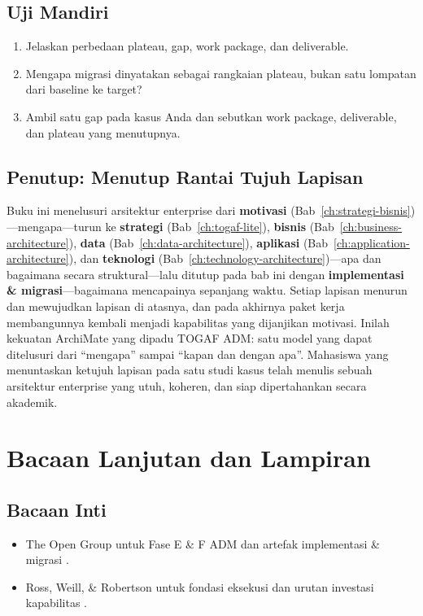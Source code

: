 \subsection*{Uji Mandiri}
\begin{enumerate}
  \item Jelaskan perbedaan plateau, gap, work package, dan deliverable.
  \item Mengapa migrasi dinyatakan sebagai rangkaian plateau, bukan satu lompatan
        dari baseline ke target?
  \item Ambil satu gap pada kasus Anda dan sebutkan work package, deliverable, dan
        plateau yang menutupnya.
\end{enumerate}

\subsection*{Penutup: Menutup Rantai Tujuh Lapisan}
Buku ini menelusuri arsitektur enterprise dari \textbf{motivasi}
(Bab~\ref{ch:strategi-bisnis})---mengapa---turun ke \textbf{strategi}
(Bab~\ref{ch:togaf-lite}), \textbf{bisnis}
(Bab~\ref{ch:business-architecture}), \textbf{data}
(Bab~\ref{ch:data-architecture}), \textbf{aplikasi}
(Bab~\ref{ch:application-architecture}), dan \textbf{teknologi}
(Bab~\ref{ch:technology-architecture})---apa dan bagaimana secara struktural---lalu
ditutup pada bab ini dengan \textbf{implementasi \& migrasi}---bagaimana
mencapainya sepanjang waktu. Setiap lapisan menurun dan mewujudkan lapisan di
atasnya, dan pada akhirnya paket kerja membangunnya kembali menjadi kapabilitas
yang dijanjikan motivasi. Inilah kekuatan ArchiMate yang dipadu TOGAF ADM: satu
model yang dapat ditelusuri dari ``mengapa'' sampai ``kapan dan dengan apa''.
Mahasiswa yang menuntaskan ketujuh lapisan pada satu studi kasus telah menulis
sebuah arsitektur enterprise yang utuh, koheren, dan siap dipertahankan secara
akademik.

\section{Bacaan Lanjutan dan Lampiran}

\subsection*{Bacaan Inti}
\begin{itemize}
  \item The Open Group untuk Fase E \& F ADM dan artefak implementasi \& migrasi
        \cite{togaf10}.
  \item Ross, Weill, \& Robertson untuk fondasi eksekusi dan urutan investasi
        kapabilitas \cite{ross2006enterprise}.
\end{itemize}

